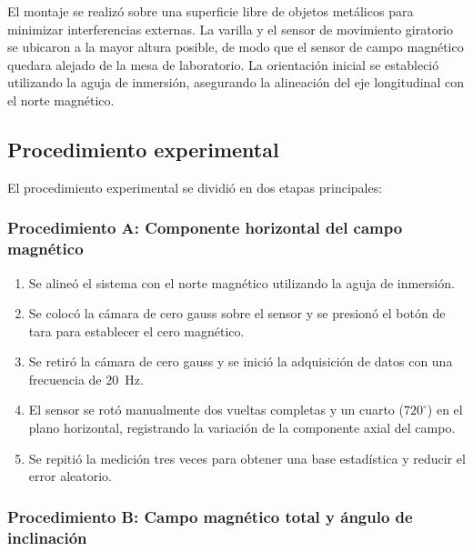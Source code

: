 \documentclass[12pt,a4paper]{article}
\begin{document}
El montaje se realizó sobre una superficie libre de objetos metálicos para minimizar interferencias externas. La varilla y el sensor de movimiento giratorio se ubicaron a la mayor altura posible, de modo que el sensor de campo magnético quedara alejado de la mesa de laboratorio. La orientación inicial se estableció utilizando la aguja de inmersión, asegurando la alineación del eje longitudinal con el norte magnético.

\vspace{0.5em}

\subsection{Procedimiento experimental}

El procedimiento experimental se dividió en dos etapas principales:

\subsubsection*{Procedimiento A: Componente horizontal del campo magnético}

\begin{enumerate}
    \item Se alineó el sistema con el norte magnético utilizando la aguja de inmersión.
    \item Se colocó la cámara de cero gauss sobre el sensor y se presionó el botón de tara para establecer el cero magnético.
    \item Se retiró la cámara de cero gauss y se inició la adquisición de datos con una frecuencia de \SI{20}{Hz}.
    \item El sensor se rotó manualmente dos vueltas completas y un cuarto (\( 720^\circ \)) en el plano horizontal, registrando la variación de la componente axial del campo.
    \item Se repitió la medición tres veces para obtener una base estadística y reducir el error aleatorio.
\end{enumerate}

\vspace{0.3em}

\subsubsection*{Procedimiento B: Campo magnético total y ángulo de inclinación}
\end{document}
